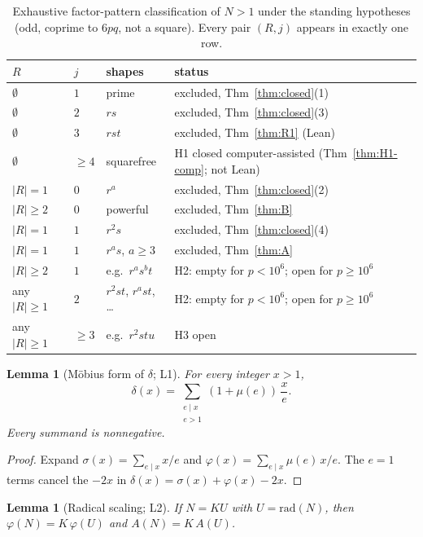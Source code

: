 \documentclass[11pt,reqno]{amsart}
\newcommand{\ph}{\varphi}
\newcommand{\sig}{\sigma}
\newtheorem{lemma}[theorem]{Lemma}
\theoremstyle{definition}
\begin{document}
\begin{table}[ht]
\centering
\caption{Exhaustive factor-pattern classification of \(N>1\) under the standing hypotheses (odd, coprime to \(6pq\), not a square). Every pair \((R,j)\) appears in exactly one row.}
\label{tab:classify}
{\footnotesize
\begin{tabular}{@{}p{1.4cm}p{0.9cm}p{3.4cm}p{5.6cm}@{}}
\toprule
\(R\) & \(j\) & shapes & status \\
\midrule
\(\emptyset\) & \(1\) & prime & excluded, Thm~\ref{thm:closed}(1) \\
\(\emptyset\) & \(2\) & \(rs\) & excluded, Thm~\ref{thm:closed}(3) \\
\(\emptyset\) & \(3\) & \(rst\) & excluded, Thm~\ref{thm:R1} (Lean) \\
\(\emptyset\) & \(\ge 4\) & squarefree & H1 closed computer-assisted (Thm~\ref{thm:H1-comp}; not Lean) \\
\(|R|=1\) & \(0\) & \(r^a\) & excluded, Thm~\ref{thm:closed}(2) \\
\(|R|\ge 2\) & \(0\) & powerful & excluded, Thm~\ref{thm:B} \\
\(|R|=1\) & \(1\) & \(r^2s\) & excluded, Thm~\ref{thm:closed}(4) \\
\(|R|=1\) & \(1\) & \(r^as\), \(a\ge 3\) & excluded, Thm~\ref{thm:A} \\
\(|R|\ge 2\) & \(1\) & e.g.\ \(r^as^bt\) & H2: empty for \(p<10^6\); open for \(p\ge 10^6\) \\
any \(|R|\ge 1\) & \(2\) & \(r^2st\), \(r^ast\), \ldots & H2: empty for \(p<10^6\); open for \(p\ge 10^6\) \\
any \(|R|\ge 1\) & \(\ge 3\) & e.g.\ \(r^2stu\) & H3 open \\
\bottomrule
\end{tabular}
}
\end{table}

\begin{lemma}[M\"obius form of \(\delta\); L1]
\label{lem:L1}
For every integer \(x>1\),
\[
\delta(x)=\sum_{\substack{e\mid x\\ e>1}}(1+\mu(e))\,\frac{x}{e}.
\]
Every summand is nonnegative.
\end{lemma}

\begin{proof}
Expand \(\sig(x)=\sum_{e\mid x}x/e\) and \(\ph(x)=\sum_{e\mid x}\mu(e)\,x/e\). The \(e=1\) terms cancel the \(-2x\) in \(\delta(x)=\sig(x)+\ph(x)-2x\).
\end{proof}

\begin{lemma}[Radical scaling; L2]
\label{lem:L2}
If \(N=KU\) with \(U=\mathrm{rad}(N)\), then \(\ph(N)=K\,\ph(U)\) and \(A(N)=K\,A(U)\).
\end{lemma}
\end{document}
